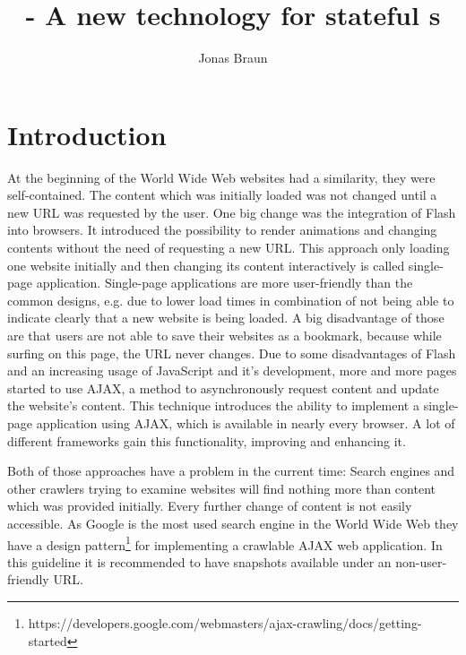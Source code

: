 \documentclass[f,bachelor,binding,twoside,palatino]{WeSTthesis}
\author{Jonas Braun}
\title{\pjaxr{} - A new technology for stateful \singlePageApplication{}s}
\def \ajax {AJAX}
\def \singlePageApplication {single-page application}
\def \SinglePageApplication {Single-page application}
\begin{document}

\maketitle %

\tableofcontents

\varclearpage



\newcommand\todo[1]{\textcolor{red}{#1}}

\section{Introduction}
    At the beginning of the World Wide Web websites had a similarity, they were self-contained. The content which was initially loaded was not changed until a new URL was requested by the user.
    One big change was the integration of Flash into browsers. It introduced the possibility to render animations and changing contents without the need of requesting a new URL.
    This approach only loading one website initially and then changing its content interactively is called \singlePageApplication{}.
    \SinglePageApplication{}s are more user-friendly than the common designs, e.g. due to lower load times in combination of not being able to indicate clearly that a new website is being loaded.
    A big disadvantage of those are that users are not able to save their websites as a bookmark, because while surfing on this page, the URL never changes.
    Due to some disadvantages of Flash and an increasing usage of JavaScript and it's development, more and more pages started to use \ajax{}, a method to asynchronously request content and update the website's content. This technique introduces the ability to implement a \singlePageApplication{} using \ajax{}, which is available in nearly every browser. A lot of different frameworks gain this functionality, improving and enhancing it.

    Both of those approaches have a problem in the current time: Search engines and other crawlers trying to examine websites will find nothing more than content which was provided initially. Every further change of content is not easily accessible.
    As Google is the most used search engine in the World Wide Web they have a design pattern\footnote{https://developers.google.com/webmasters/ajax-crawling/docs/getting-started} for implementing a crawlable \ajax{} web application. In this guideline it is recommended to have snapshots available under an non-user-friendly URL.
\end{document}
